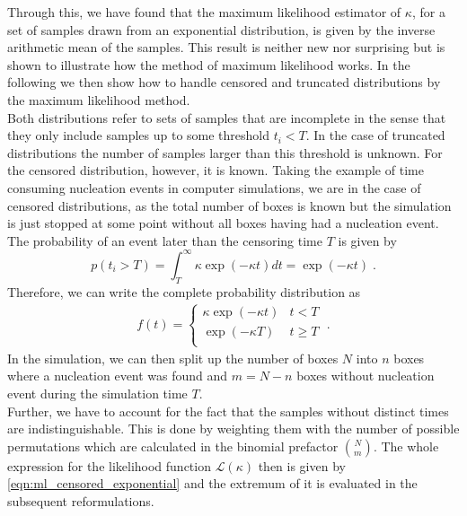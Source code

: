 Through this, we have found that the maximum likelihood estimator of $\kappa$, for a set of samples drawn from an exponential distribution, is given by the inverse arithmetic mean of the samples. This result is neither new nor surprising but is shown to illustrate how the method of maximum likelihood works. In the following we then show how to handle censored and truncated distributions by the maximum likelihood method.\\
Both distributions refer to sets of samples that are incomplete in the sense that they only include samples up to some threshold $t_i < T$. In the case of truncated distributions the number of samples larger than this threshold is unknown. For the censored distribution, however, it is known. Taking the example of time consuming nucleation events in computer simulations, we are in the case of censored distributions, as the total number of boxes is known but the simulation is just stopped at some point without all boxes having had a nucleation event. The probability of an event later than the censoring time $T$ is given by
\begin{equation}
\label{eqn:prob_t_larger_T}
p(t_i>T) = \int_T^{\infty} \kappa \exp(-\kappa t) dt = \exp(-\kappa t) \; \text{.}
\end{equation}
Therefore, we can write the complete probability distribution as
\begin{align}
\label{eqn:pdf_censored}
f(t) = 
\begin{cases}
\kappa \exp(-\kappa t) & t < T\\
\exp(-\kappa T) & t \geq T\\ 
\end{cases} \; \text{.}
\end{align}
In the simulation, we can then split up the number of boxes $N$ into $n$ boxes where a nucleation event was found and $m = N -n$ boxes without nucleation event during the simulation time $T$.\\
Further, we have to account for the fact that the samples without distinct times are indistinguishable. This is done by weighting them with the number of possible permutations which are calculated in the binomial prefactor $\binom{N}{m}$. The whole expression for the likelihood function $\mathcal{L}(\kappa)$ then is given by \autoref{eqn:ml_censored_exponential} and the extremum of it is evaluated in the subsequent reformulations.

